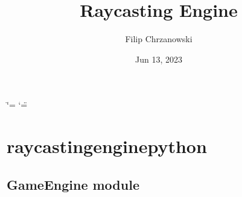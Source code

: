 \documentclass[letterpaper,10pt,english]{sphinxmanual}
\title{Raycasting Engine}
\date{Jun 13, 2023}
\author{Filip Chrzanowski}
\begin{document}
\ifdefined\shorthandoff
  \ifnum\catcode`\=\string=\active\shorthandoff{=}\fi
  \ifnum\catcode`\"=\active{}\fi
\fi

\pagestyle{empty}
\sphinxmaketitle
\pagestyle{plain}
\sphinxtableofcontents
\pagestyle{normal}
\label{\detokenize{index::doc}}


\sphinxstepscope


\chapter{raycasting\sphinxhyphen{}engine\sphinxhyphen{}python}
\label{\detokenize{modules:raycasting-engine-python}}\label{\detokenize{modules::doc}}
\sphinxstepscope


\section{GameEngine module}
\label{\detokenize{GameEngine:module-GameEngine}}\label{\detokenize{GameEngine:gameengine-module}}\label{\detokenize{GameEngine::doc}}
\end{document}
